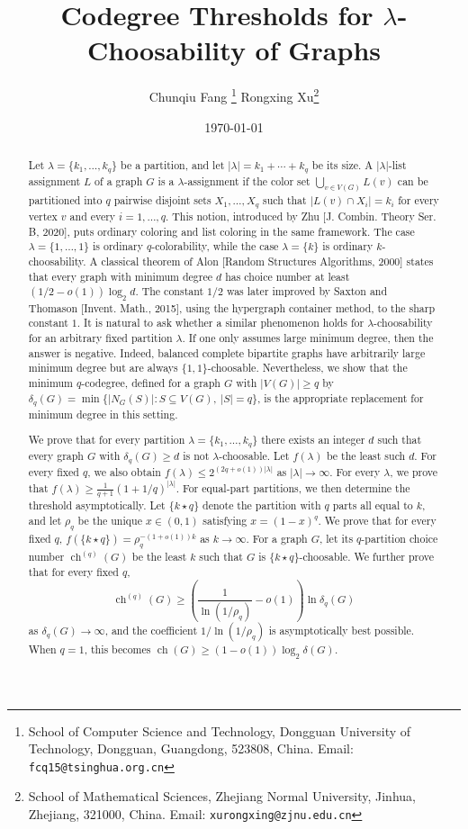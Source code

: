 \documentclass[12pt]{article}
\title{\large{\bf Codegree Thresholds for $\lambda$-Choosability of Graphs}}
\author{
  Chunqiu Fang \thanks{School of Computer Science and Technology, Dongguan University of Technology, Dongguan, Guangdong, 523808, China. Email: \texttt{fcq15@tsinghua.org.cn}}
  \quad
  Rongxing Xu\thanks{School of Mathematical Sciences, Zhejiang Normal University, Jinhua, Zhejiang, 321000, China. Email: \texttt{xurongxing@zjnu.edu.cn}}
}
\date{\today}
\numberwithin{equation}{section}
\theoremstyle{definition}
\newcommand{\equalparts}[2]{\{#1\star #2\}}
\begin{document}
\maketitle
\begin{abstract}
Let $\lambda = \{k_1,\ldots,k_q\}$ be a partition, and let
$|\lambda| = k_1 + \cdots + k_q$ be its size. A $|\lambda|$-list assignment $L$ of
a graph $G$ is a $\lambda$-assignment if the color set
$\bigcup_{v \in V(G)}L(v)$ can be partitioned into $q$ pairwise disjoint sets
$X_1,\ldots,X_q$ such that
$|L(v) \cap X_i| = k_i$ for every vertex $v$ and every
$i = 1,\ldots,q$. This notion,
introduced by Zhu [J. Combin. Theory Ser. B, 2020], puts ordinary coloring and
list coloring in the same framework. The case
$\lambda = \{1,\ldots,1\}$ is ordinary $q$-colorability, while the
case $\lambda = \{k\}$ is ordinary $k$-choosability. A classical theorem of
Alon [Random
Structures Algorithms, 2000] states that every graph with minimum degree $d$
has choice number at least $(1/2 - o(1))\log_2 d$. The constant $1/2$ was later
improved by Saxton and Thomason [Invent. Math., 2015], using the hypergraph
container method, to the sharp constant $1$. It is natural to ask whether a similar
phenomenon holds for $\lambda$-choosability for an arbitrary fixed partition
$\lambda$. If one only assumes large minimum degree, then the answer is negative.
Indeed, balanced complete bipartite graphs have arbitrarily large minimum
degree but are always $\{1,1\}$-choosable. Nevertheless, we show that the minimum
$q$-codegree, defined for a graph $G$ with $|V(G)|\geq q$ by
$\delta_q(G) = \min\{|N_G(S)| : S \subseteq V(G),\ |S| = q\}$, is the
appropriate replacement for minimum degree in this setting.

We prove that for every partition
$\lambda = \{k_1,\ldots,k_q\}$ there exists an integer $d$ such that every graph
$G$ with $\delta_q(G) \geq d$ is not $\lambda$-choosable. Let $f(\lambda)$
be the least such $d$. For every fixed $q$, we also obtain
$f(\lambda)\leq 2^{(2q+o(1))|\lambda|}$ as $|\lambda|\to\infty$. For every
$\lambda$, we prove that
$f(\lambda)\geq \frac{1}{q+1}(1+1/q)^{|\lambda|}$. For equal-part partitions, we
then determine the threshold asymptotically. Let
$\equalparts{k}{q}$ denote the partition with $q$ parts all equal to $k$, and let
$\rho_q$ be the unique $x\in(0,1)$ satisfying
$x=(1-x)^q$. We prove that for every fixed $q$,
$f(\equalparts{k}{q})=\rho_q^{-(1+o(1))k}$ as $k\to\infty$.
For a graph $G$, let its $q$-partition choice number
$\operatorname{ch}^{(q)}(G)$ be the least $k$ such that $G$ is
$\equalparts{k}{q}$-choosable. We further prove that for every fixed
$q$, 
\[
\operatorname{ch}^{(q)}(G)\geq
\left(\frac{1}{\ln(1/\rho_q)}-o(1)\right)\ln\delta_q(G)
\] 
as $\delta_q(G)\to\infty$, and the
coefficient $1/\ln(1/\rho_q)$ is asymptotically best possible. When $q=1$,
this becomes $\operatorname{ch}(G)\geq(1-o(1))\log_2\delta(G)$.
\end{abstract}
\end{document}
